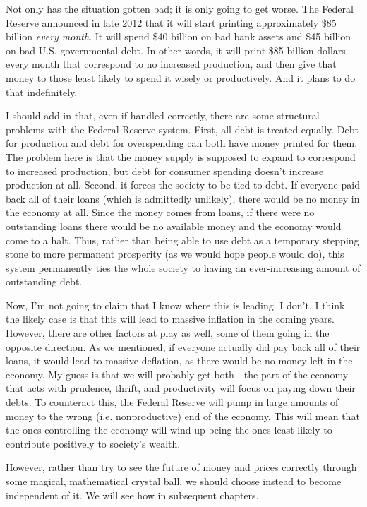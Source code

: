 Not only has the situation gotten bad; it is only going to get worse.
The Federal Reserve announced in late 2012 that it will start printing
approximately \$85 billion \textit{every month}. It will spend \$40
billion on bad bank assets and \$45 billion on bad U.S. governmental debt. In other
words, it will print \$85 billion dollars every month that correspond
to no increased production, and then give that money to those
least likely to spend it wisely or productively. And it plans to do
that indefinitely.

I should add in that, even if handled correctly, there are some structural
problems with the Federal Reserve system.  First, all debt is treated 
equally.  Debt for production and debt for overspending can both have
money printed for them.  The problem here is that the money supply is supposed
to expand to correspond to increased production, but debt for consumer
spending doesn't increase production at all. Second, it forces the society
to be tied to debt.  If everyone paid back all of their loans (which is 
admittedly unlikely), there would be no money in the economy at all.
Since the money comes from loans, if there were no outstanding loans
there would be no available money and the economy would come to a halt.  
Thus, rather than being able to use debt as a temporary stepping stone
to more permanent prosperity (as we would hope people would do), this
system permanently ties the whole society to having an ever-increasing
amount of outstanding debt.

Now, I’m not going to claim that I know where this is leading. I don’t.
I think the likely case is that this will lead to massive inflation in
the coming years. 
However, there are other factors at play as well, some of them going in
the opposite direction.  As we mentioned, if everyone 
actually did pay back all of their loans, it would lead to massive deflation, as
there would be no money left in the economy.
My guess is that we will probably get both---the part of the economy
that acts with prudence, thrift, and productivity will focus on paying down
their debts.  To counteract this, the Federal Reserve will pump in large amounts
of money to the wrong (i.e. nonproductive) end of the economy.  This will mean
that the ones controlling the economy will wind up being the ones
least likely to contribute positively to society's wealth.

However, rather than try to see the future of money and prices correctly through some magical,
mathematical crystal ball, we should choose instead to become
independent of it.  We will see how in subsequent chapters.

